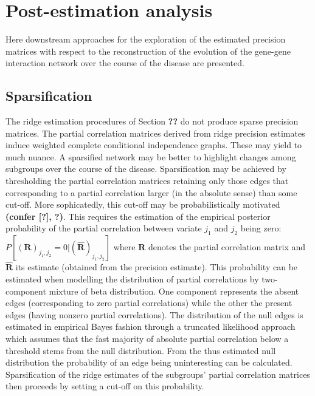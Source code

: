 \documentclass[10pt]{article}
\begin{document}
\section{Post-estimation analysis}\label{postestimation}
Here downstream approaches for the exploration of the estimated precision matrices with respect
to the reconstruction of the evolution of the gene-gene interaction network over the course of the
disease are presented.

\subsection{Sparsification}\label{sparsify}
The ridge estimation procedures of Section \textbf{??} do not produce sparse precision matrices. The partial correlation matrices derived from ridge precision estimates induce weighted complete conditional independence graphs. These may yield to much nuance. A sparsified network may be better to highlight changes among subgroups over the course of the disease. Sparsification may be achieved by thresholding the partial correlation matrices retaining only those edges that corresponding to a partial correlation larger (in the absolute sense) than some cut-off. More sophicatedly, this cut-off may be probabilistically motivated \textbf{(confer [?], ?)}. This requires the estimation of the empirical posterior probability of the partial correlation between variate $j_1$ and $j_2$ being zero: $P[(\mathbf{R})_{j_1,j_2} = 0| (\widehat{\mathbf{R}})_{j_1,j_2} ]$ where $\mathbf{R}$ denotes the partial correlation matrix and $\widehat{\mathbf{R}}$ its estimate (obtained from the precision estimate). This probability can be estimated when modelling the distribution of partial correlations by two-component mixture of beta distribution. One component represents the absent edges (corresponding to zero partial correlations) while the other the present edges (having nonzero partial correlations). The distribution of the null edges is estimated in empirical Bayes fashion through a truncated likelihood approach which assumes that the fast majority of absolute partial correlation below a threshold stems from the null distribution. From the thus estimated null distribution the
probability of an edge being uninteresting can be calculated. Sparsification of the ridge estimates of the subgroups' partial correlation matrices then proceeds by setting a cut-off on this probability.
\end{document}

